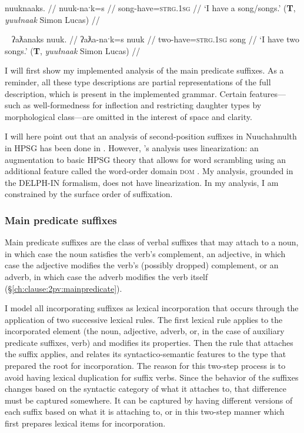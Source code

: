 \ex \label{ex:havesong2}
\begingl
\glpreamble nuuknaaks. //
\gla nuuk-naˑk=s //
\glb song-have=\textsc{strg.1sg} //
\glft `I have a song/songs.' (\textbf{T}, \textit{yuułnaak} Simon Lucas) //
\endgl
\xe

\ex~ \label{ex:havetwosongs2}
\begingl
\glpreamble ʔaƛanaks nuuk. //
\gla ʔaƛa-naˑk=s nuuk //
\glb two-have=\textsc{strg.1sg} song //
\glft `I have two songs.' (\textbf{T}, \textit{yuułnaak} Simon Lucas) //
\endgl
\xe


I will first show my implemented analysis of the main predicate suffixes. As a reminder, all these type descriptions are partial representations of the full description, which is present in the implemented grammar. Certain features---such as well-formedness for inflection and restricting daughter types by morphological class---are omitted in the interest of space and clarity.

I will here point out that an analysis of second-position suffixes in Nuuchahnulth in HPSG has been done in \citet{waldie2004}. However, \citeauthor{waldie2004}'s analysis uses linearization: an augmentation to basic HPSG theory that allows for word scrambling using an additional feature called the word-order domain \textsc{dom} \citep{reape1993}. My analysis, grounded in the DELPH-IN formalism, does not have linearization. In my analysis, I am constrained by the surface order of suffixation.

\subsubsection{Main predicate suffixes}

Main predicate suffixes are the class of verbal suffixes that may attach to a noun, in which case the noun satisfies the verb's complement, an adjective, in which case the adjective modifies the verb's (possibly dropped) complement, or an adverb, in which case the adverb modifies the verb itself (\S\ref{ch:clause:2pv:mainpredicate}).

I model all incorporating suffixes as lexical incorporation that occurs through the application of two successive lexical rules. The first lexical rule applies to the incorporated element (the noun, adjective, adverb, or, in the case of auxiliary predicate suffixes, verb) and modifies its properties. Then the rule that attaches the suffix applies, and relates its syntactico-semantic features to the type that prepared the root for incorporation. The reason for this two-step process is to avoid having lexical duplication for suffix verbs. Since the behavior of the suffixes changes based on the syntactic category of what it attaches to, that difference must be captured somewhere. It can be captured by having different versions of each suffix based on what it is attaching to, or in this two-step manner which first prepares lexical items for incorporation.

